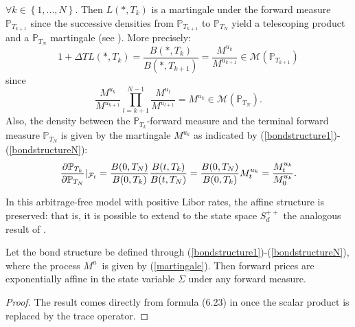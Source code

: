 $\forall k \in \left\{ 1,...,N\right\}$. Then $L(*,T_{k})$ is a martingale under the forward measure $\mathbb{P}_{T_{k+1}}$ since the successive densities from $\mathbb{P}_{T_{k+1}}$ to $\mathbb{P}_{T_{N}}$ yield a telescoping product and a $\mathbb{P}_{T_{N}}$ martingale (see \cite{article_KRPT2009}). More precisely:
\begin{equation}
1+\Delta T L(*,T_{k})=\frac{B(*,T_{k})}{B(*,T_{k+1})}=\frac{M^{u_{k}}}{M^{u_{k+1}}}\in \mathcal{M}\left( \mathbb{P}_{T_{k+1}}\right)
\end{equation}
since
\begin{equation}
\frac{M^{u_{k}}}{M^{u_{k+1}}}\prod_{l=k+1}^{N-1}\frac{M^{u_{l}}}{M^{u_{l+1}}}= M^{u_{k}} \in \mathcal{M} \left( \mathbb{P}_{T_{N}}\right).
\end{equation}
Also, the density between the $\mathbb{P}_{T_{k}}$-forward measure and the terminal forward measure $\mathbb{P}_{T_{N}}$ is given by the martingale $M^{u_{k}}$ as indicated by (\ref{bondstructure1})-(\ref{bondstructureN}):
\begin{equation}
\frac{\partial \mathbb{P}_{T_{k}}}{\partial \mathbb{P}_{T_{N}}} \arrowvert_{\mathcal{F}_{t}}=\frac{B(0,T_{N})}{B(0,T_{k})}\frac{B(t,T_{k})}{B(t,T_{N})}=\frac{B(0,T_{N})}{B(0,T_{k})}M^{u_{k}}_{t}=\frac{M^{u_{k}}_{t}}{M^{u_{k}}_{0}}.\label{change_measure}
\end{equation}

In this arbitrage-free model with positive Libor rates, the affine structure is preserved: that is, it is possible to extend to the state space $S_d^{++}$ the analogous result of \cite{article_KRPT2009}.

\begin{proposition}Let the bond structure be defined through (\ref{bondstructure1})-(\ref{bondstructureN}), where the process $M^{u_.}$ is given by (\ref{martingale}). Then forward prices are exponentially affine in the state variable $\Sigma$ under any forward measure.
\end{proposition}

\begin{proof} The result comes directly from formula (6.23) in \cite{article_KRPT2009} once the scalar product is replaced  by the trace operator. \end{proof}





